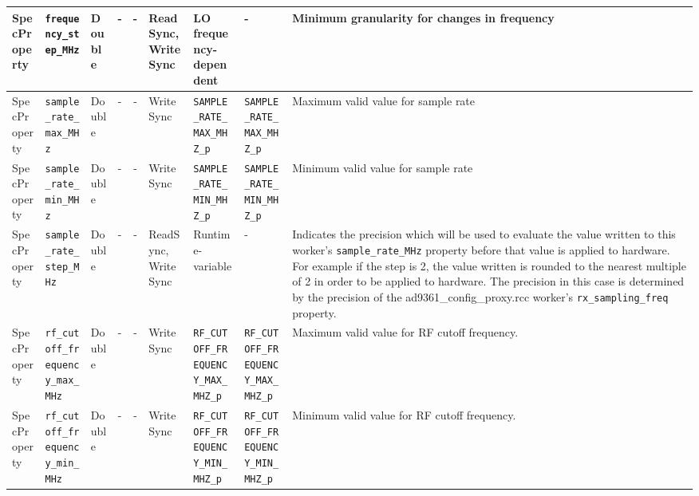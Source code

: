 \begin{landscape}
\begin{scriptsize}
\begin{longtable}{|p{1.8cm}|p{4.1cm}|p{1cm}|c|c|p{1.6cm}|p{3.7cm}|p{3.7cm}|p{2.5cm}|}
			\hline
			SpecProperty & \verb+frequency_step_MHz+           & Double& -        & -          & ReadSync, WriteSync & LO frequency-dependent & - & Minimum granularity for changes in frequency                                                                                                                                                                                \\
			\hline
			SpecProperty & \verb+sample_rate_max_MHz+          & Double& -        & -          & WriteSync & \verb+SAMPLE_RATE_MAX_MHZ_p+ & \verb+SAMPLE_RATE_MAX_MHZ_p+ & Maximum valid value for sample rate                                                                                                                                                                                         \\
			\hline
			SpecProperty & \verb+sample_rate_min_MHz+          & Double& -        & -          & WriteSync & \verb+SAMPLE_RATE_MIN_MHZ_p+ & \verb+SAMPLE_RATE_MIN_MHZ_p+ & Minimum valid value for sample rate                                                                                                                                                                                         \\
			\hline
			SpecProperty & \verb+sample_rate_step_MHz+         & Double& -        & -          & ReadSync, WriteSync & Runtime-variable & - & Indicates the precision which will be used to evaluate the value written
        to this worker's \verb+sample_rate_MHz+ property
        before that value is applied to hardware. For example if the step is 2,
        the value written is rounded to the nearest multiple of 2 in order to
        be applied to hardware. The precision in this case is determined by the
        precision of the ad9361\_config\_proxy.rcc worker's
        \verb+rx_sampling_freq+ property.                                                                                                                                                                              \\
			\hline
			SpecProperty & \verb+rf_cutoff_frequency_max_MHz+  & Double& -        & -          & WriteSync      & \verb+RF_CUTOFF_FREQUENCY_MAX_MHZ_p+ & \verb+RF_CUTOFF_FREQUENCY_MAX_MHZ_p+ & Maximum valid value for RF cutoff frequency. \\
			\hline
			SpecProperty & \verb+rf_cutoff_frequency_min_MHz+  & Double& -        & -          & WriteSync      & \verb+RF_CUTOFF_FREQUENCY_MIN_MHZ_p+ & \verb+RF_CUTOFF_FREQUENCY_MIN_MHZ_p+  & Minimum valid value for RF cutoff frequency. \\

\end{longtable}
\end{scriptsize}
\end{landscape}
